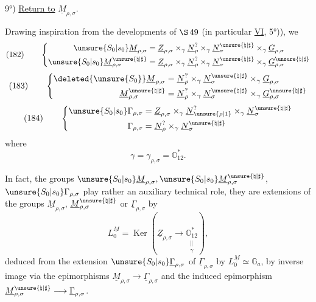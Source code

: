 
9°) \uline{Return to} \(\underline M_{\rho,\sigma}\).

Drawing inspiration from the developments of
\(\S\,49\) (in particular \uline{VI}, 5°)), we 
\[
(182)\qquad
\left\{
\begin{aligned}
\unsure{S_0|s_0}\underline M_{\rho,\sigma}
&=\underline Z_{\rho,\sigma}
\times_\gamma\underline N_\rho^{?}
\times_\gamma\underline N_\sigma^{\unsure{\natural|\sharp}}
\times_\gamma\underline G_{\rho,\sigma}\\
\unsure{S_0|s_0}\underline M_{\rho,\sigma}^{\unsure{\natural|\sharp}}
&=\underline Z_{\rho,\sigma}
\times_\gamma\underline N_\rho^{?}
\times_\gamma\underline N_\sigma^{\unsure{\natural|\sharp}}
\times_\gamma\underline G_{\rho,\sigma}^{\unsure{\natural|\sharp}}
\end{aligned}
\right.
\]
\[
(183)\qquad
\left\{
\begin{aligned}
\deleted{\unsure{S_0}}\underline M_{\rho,\sigma}
&=\underline N_\rho^{?}
\times_\gamma\underline N_\sigma^{\unsure{\natural|\sharp}}
\times_\gamma\underline G_{\rho,\sigma}\\
\underline M_{\rho,\sigma}^{\unsure{\natural|\sharp}}
&=\underline N_\rho^{?}
\times_\gamma\underline N_\sigma^{\unsure{\natural|\sharp}}
\times_\gamma\underline G_{\rho,\sigma}^{\unsure{\natural|\sharp}}
\end{aligned}
\right.
\]
\[
(184)\qquad
\left\{
\begin{aligned}
\unsure{S_0|s_0}\Gamma_{\rho,\sigma}
&=\underline Z_{\rho,\sigma}
\times_\gamma\underline N_{\unsure{\rho|1}}^{?}
\times_\gamma\underline N_\sigma^{\unsure{\natural|\sharp}}\\
\Gamma_{\rho,\sigma}
&=\underline N_\rho^{?}
\times_\gamma\underline N_\sigma^{\unsure{\natural|\sharp}}
\end{aligned}
\right.
\]
where \deleted{\(\unsure{\gamma=}\)}
\[
\gamma=\gamma_{\rho,\sigma}=\mathbb O_{12}^{*}.
\]

In fact, the groups
\(\unsure{S_0|s_0}\underline M_{\rho,\sigma},
\unsure{S_0|s_0}\underline M_{\rho,\sigma}^{\unsure{\natural|\sharp}}\),
\(\unsure{S_0|s_0}\Gamma_{\rho,\sigma}\)
play rather an auxiliary technical role, they are extensions of the
groups \(\underline M_{\rho,\sigma}\),
\(\underline M_{\rho,\sigma}^{\unsure{\natural|\sharp}}\)
or \(\underline\Gamma_{\rho,\sigma}\) by
\[
L_0^{\underline M}
=\operatorname{Ker}\left(
\underline Z_{\rho,\sigma}\longrightarrow
\underset{\substack{\parallel\\\gamma}}{\mathbb O_{12}^{*}}
\right),
\]
deduced
from the extension
\(\unsure{S_0|s_0}\underline\Gamma_{\rho,\sigma}\)
of \(\underline\Gamma_{\rho,\sigma}\) by
\(L_0^{\underline M}\simeq\mathbb G_a\),
by inverse image via the epimorphisms
\(\underline M_{\rho,\sigma}\longrightarrow\underline\Gamma_{\rho,\sigma}\)
and the induced epimorphism
\(\underline M_{\rho,\sigma}^{\unsure{\natural|\sharp}}
\longrightarrow\underline\Gamma_{\rho,\sigma}\).

